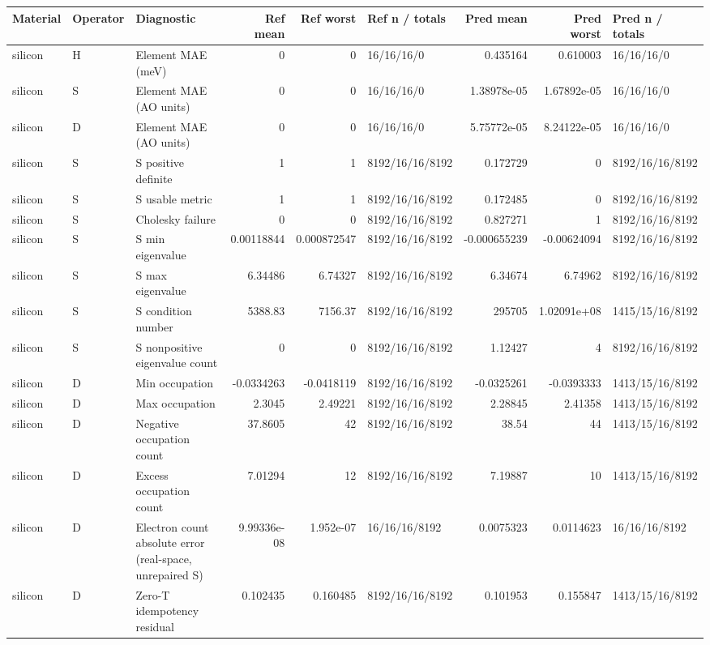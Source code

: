 \begin{tabular}{lllrrlrrl}
\toprule
Material & Operator & Diagnostic & Ref mean & Ref worst & Ref n / totals & Pred mean & Pred worst & Pred n / totals \\
\midrule
silicon & H & Element MAE (meV) & 0 & 0 & 16/16/16/0 & 0.435164 & 0.610003 & 16/16/16/0 \\
silicon & S & Element MAE (AO units) & 0 & 0 & 16/16/16/0 & 1.38978e-05 & 1.67892e-05 & 16/16/16/0 \\
silicon & D & Element MAE (AO units) & 0 & 0 & 16/16/16/0 & 5.75772e-05 & 8.24122e-05 & 16/16/16/0 \\
silicon & S & S positive definite & 1 & 1 & 8192/16/16/8192 & 0.172729 & 0 & 8192/16/16/8192 \\
silicon & S & S usable metric & 1 & 1 & 8192/16/16/8192 & 0.172485 & 0 & 8192/16/16/8192 \\
silicon & S & Cholesky failure & 0 & 0 & 8192/16/16/8192 & 0.827271 & 1 & 8192/16/16/8192 \\
silicon & S & S min eigenvalue & 0.00118844 & 0.000872547 & 8192/16/16/8192 & -0.000655239 & -0.00624094 & 8192/16/16/8192 \\
silicon & S & S max eigenvalue & 6.34486 & 6.74327 & 8192/16/16/8192 & 6.34674 & 6.74962 & 8192/16/16/8192 \\
silicon & S & S condition number & 5388.83 & 7156.37 & 8192/16/16/8192 & 295705 & 1.02091e+08 & 1415/15/16/8192 \\
silicon & S & S nonpositive eigenvalue count & 0 & 0 & 8192/16/16/8192 & 1.12427 & 4 & 8192/16/16/8192 \\
silicon & D & Min occupation & -0.0334263 & -0.0418119 & 8192/16/16/8192 & -0.0325261 & -0.0393333 & 1413/15/16/8192 \\
silicon & D & Max occupation & 2.3045 & 2.49221 & 8192/16/16/8192 & 2.28845 & 2.41358 & 1413/15/16/8192 \\
silicon & D & Negative occupation count & 37.8605 & 42 & 8192/16/16/8192 & 38.54 & 44 & 1413/15/16/8192 \\
silicon & D & Excess occupation count & 7.01294 & 12 & 8192/16/16/8192 & 7.19887 & 10 & 1413/15/16/8192 \\
silicon & D & Electron count absolute error (real-space, unrepaired S) & 9.99336e-08 & 1.952e-07 & 16/16/16/8192 & 0.0075323 & 0.0114623 & 16/16/16/8192 \\
silicon & D & Zero-T idempotency residual & 0.102435 & 0.160485 & 8192/16/16/8192 & 0.101953 & 0.155847 & 1413/15/16/8192 \\

\end{tabular}
